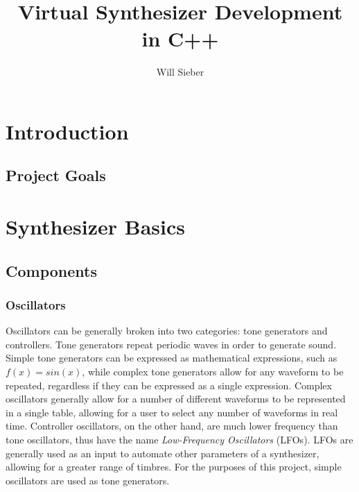 \documentclass[12pt]{article}
\title{Virtual Synthesizer Development in C++}
\date{\vspace{-5ex}}
\author{Will Sieber}
\begin{document}
\maketitle

\tableofcontents
\newpage


\section{Introduction}

\subsection{Project Goals}


\section{Synthesizer Basics}

\subsection{Components}

\subsubsection{Oscillators}
Oscillators can be generally broken into two categories: tone generators and controllers. Tone generators repeat periodic waves in order to generate sound. Simple tone generators can be expressed as mathematical expressions, such as \(f(x) = sin(x)\), while complex tone generators allow for any waveform to be repeated, regardless if they can be expressed as a single expression. Complex oscillators generally allow for a number of different waveforms to be represented in a single table, allowing for a user to select any number of waveforms in real time. Controller oscillators, on the other hand, are much lower frequency than tone oscillators, thus have the name \textit{Low-Frequency Oscillators} (LFOs). LFOs are generally used as an input to automate other parameters of a synthesizer, allowing for a greater range of timbres. For the purposes of this project, simple oscillators are used as tone generators. 
\end{document}
